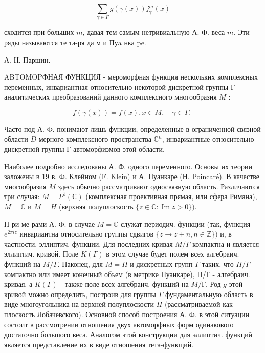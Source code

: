 \documentclass[10pt]{article}
\begin{document}
\[

\sum_{\gamma \in \Gamma} g(\gamma(x)) j_{\gamma}^{m}(x)

\]



сходится при больших $m$, давая тем самым нетривиальную А. Ф. веса $m$. Эти ряды называются те та-ря да м и Пуa нка pe.



А. Н. Паршин.



ABTOMOPФНАЯ ФУНКЦИЯ - мероморфная функция нескольких комплексных переменных, инвариантная относительно некоторой дискретной группы Г аналитических преобразований данного комплексного многообразия $M$ :



\[

f(\gamma(x))=f(x), x \in M, \quad \gamma \in \Gamma \text {. }

\]



Часто под А. Ф. понимают лишь функции, определенные в ограниченной связной области $D$-мерного комплексного пространства $\mathbb{C}^{n}$, инвариантные относительно дискретной группы Г автоморфизмов этой области.



Наиболее подробно исследованы А. Ф. одного переменного. Основы их теории заложены в 19 в. Ф. Клейном (F. Klein) и А. Пуанкаре (Н. Poincaré). В качестве многообразия $M$ здесь обычно рассматривают односвязную область. Различаются три случая: $M=P^{1}(\mathbb{C})$ (комплексная проективная прямая, или сфера Римана), $M=\mathbb{C}$ и $M=H$ (верхняя полуплоскость $\{z \in \mathbb{C}: \operatorname{Im} z>0\})$.



П ри ме рами А. Ф. в случае $M=\mathbb{C}$ служат периодич. функции (так, функция $e^{2 \pi i z}$ инвариантна относительно группы сдвигов $\{z \rightarrow z+n, n \in \mathbb{Z}\})$ и, в частности, эллиптич. функции. Для последних кривая $M / \Gamma$ компактна и является эллиптич. кривой. Поле $K(\Gamma)$ в этом случае будет полем всех алгебраич. функций на $M / \Gamma$. Наконец, для $M=H$ и дискретных групп $\Gamma$ таких, что $H / \Gamma$ компактно или имеет конечный объем (в метрике Пуанкаре), H/Г - алгебраич. кривая, а $K(\Gamma)$ - также поле всех алгебраич. функций на $M / Г$. Род $g$ этой кривой можно определить, построив для группы $\Gamma$ фундаментальную область в виде многоугольника на верхней полуплоскости $H$ (рассматриваемой как плоскость Лобачевского). Основной способ построения А. Ф. в этой ситуации состоит в рассмотрении отношения двух автоморфных форм одинакового достаточно большого веса. Аналогом этой конструкции для эллиптич. функций является представление их в виде отношения тета-функщий.
\end{document}
